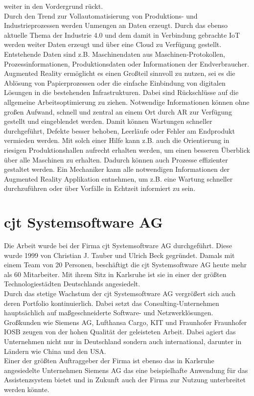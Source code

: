 weiter in den Vordergrund rückt. 
\\ 
\linebreak
Durch den Trend zur Vollautomatisierung von Produktions- und Industrieprozessen werden Unmengen an Daten erzeugt. Durch das ebenso 
aktuelle Thema der Industrie 4.0 und dem damit in Verbindung gebrachte \acs{IoT} werden weiter Daten erzeugt und über eine Cloud zu 
Verfügung gestellt. Entstehende Daten sind z.B. Maschinendaten aus Maschinen-Protokollen, Prozessinformationen, Produktionsdaten oder 
Informationen der Endverbraucher. \cite{industrie40.2019f} Augmented Reality ermöglicht es einen Großteil sinnvoll zu nutzen, sei es 
die Ablösung von Papierprozessen oder die einfache Einbindung von digitalen Lösungen in die bestehenden Infrastrukturen. \cite{industrie40ar.2019n} 
Dabei sind Rückschlüsse auf die allgemeine Arbeitsoptimierung zu ziehen. Notwendige Informationen können ohne 
großen Aufwand, schnell und zentral an einem Ort durch AR zur Verfügung gestellt und eingeblendet werden. Damit können 
Wartungen schneller durchgeführt, Defekte besser behoben, Leerläufe oder Fehler am Endprodukt vermieden werden. Mit solch einer Hilfe 
kann z.B. auch die Orientierung in riesigen Produktionshallen aufrecht erhalten werden, um einen besseren Überblick über alle Maschinen 
zu erhalten. Dadurch können auch Prozesse effizienter gestaltet werden. Ein Mechaniker kann alle notwendigen Informationen der Augmented 
Reality Applikation entnehmen, um z.B. eine Wartung schneller durchzuführen oder über Vorfälle in Echtzeit informiert zu sein. 

\section{cjt Systemsoftware AG}
\label{chap:cjt}
Die Arbeit wurde bei der Firma cjt Systemsoftware AG durchgeführt. Diese wurde
1999 von Christian J. Tauber und Ulrich Beck gegründet. Damals mit einem Team
von 20 Personen, beschäftigt die cjt Systemsoftware AG heute mehr als 60 Mitarbeiter. 
Mit ihrem Sitz in Karlsruhe ist sie in einer der größten Technologiestädten Deutschlands angesiedelt.
\\
\linebreak
Durch das stetige Wachstum der cjt Systemsoftware AG vergrößert sich auch deren
Portfolio kontinuierlich. Dabei setzt das Consulting-Unternehmen hauptsächlich auf maßgeschneiderte
Software- und Netzwerklösungen. Großkunden wie Siemens AG, Lufthansa Cargo,
\acs{KIT} und Fraunhofer \acs{Fraunhofer IOSB} zeugen von der hohen Qualität der geleisteten Arbeit. 
Dabei agiert das Unternehmen nicht nur in Deutschland sondern auch international, darunter in Ländern wie China und den USA.
\\ 
\linebreak
Einer der größten Auftraggeber der Firma ist ebenso das in Karlsruhe angesiedelte Unternehmen Siemens AG das eine beispielhafte 
Anwendung für das Assistenzsystem bietet und in Zukunft auch der Firma zur Nutzung unterbreitet werden könnte. 

